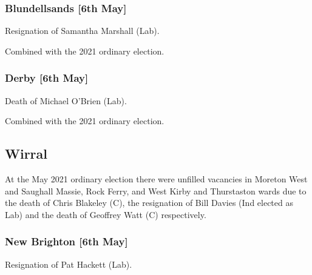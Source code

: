 \documentclass[a4paper,openany]{book}
\begin{document}
\begin{resultsiii}
\subsubsection*{Blundellsands \hspace*{\fill}\nolinebreak[1]%
	\enspace\hspace*{\fill}
	[6th May]}


Resignation of Samantha Marshall (Lab).

Combined with the 2021 ordinary election.

\subsubsection*{Derby \hspace*{\fill}\nolinebreak[1]%
	\enspace\hspace*{\fill}
	[6th May]}


Death of Michael O'Brien (Lab).

Combined with the 2021 ordinary election.

\subsection*{Wirral}

At the May 2021 ordinary election there were unfilled vacancies in Moreton West and Saughall Massie, Rock Ferry, and West Kirby and Thurstaston wards due to the death of Chris Blakeley (C), the resignation of Bill Davies (Ind elected as Lab) and the death of Geoffrey Watt (C) respectively.

\subsubsection*{New Brighton \hspace*{\fill}\nolinebreak[1]%
	\enspace\hspace*{\fill}
	[6th May]}


Resignation of Pat Hackett (Lab).


\end{resultsiii}
\end{document}
